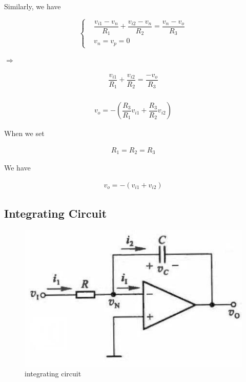 Similarly, we have

\begin{equation*}
  \left\{
  \begin{aligned}
    & \dfrac{v_{i1} - v_n}{R_1} + \dfrac{v_{i2}- v_n}{R_2} = \dfrac{v_n - v_o}{R_3} \\
    & v_n= v_p = 0
  \end{aligned}
  \right.
\end{equation*}

$\Rightarrow$

\begin{equation*}
  \begin{aligned}
    \dfrac{v_{i1}}{R_1} + \dfrac{v_{i2}}{R_2} = \dfrac{- v_o}{R_3} \\
  \end{aligned}
\end{equation*}

\begin{equation*}
  \begin{aligned}
    v_o = - \left( \dfrac{R_3}{R_1} v_{i1} + \dfrac{R_3}{R_2} v_{i2} \right) 
  \end{aligned}
\end{equation*}

When we set

\begin{equation*}
  \begin{aligned}
    R_1 = R_2 = R_3
  \end{aligned}
\end{equation*}

We have

\begin{equation*}
  \begin{aligned}
    v_o = - \left( v_{i1} + v_{i2} \right)
  \end{aligned}
\end{equation*}

\subsection{Integrating Circuit}

\begin{figure}[H]
  \centering
  \includegraphics[width=0.6\linewidth]{figures/integrating-circuit}
  \caption{integrating circuit}
\end{figure}

